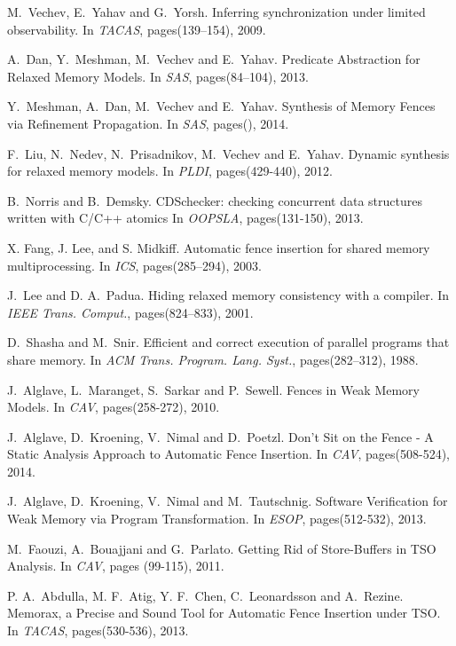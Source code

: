 \documentclass[preprint,9pt]{sigplanconf}
\begin{document}
\begin{thebibliography}{10}
M.~Vechev, E.~Yahav and G.~Yorsh.
\newblock Inferring synchronization under limited observability. 
\newblock In {\em TACAS}, pages(139–154), 2009.

A.~Dan, Y.~Meshman, M.~Vechev and E.~Yahav.
\newblock Predicate Abstraction for Relaxed Memory Models. 
\newblock In {\em SAS}, pages(84–104), 2013.

Y.~Meshman, A.~Dan, M.~Vechev and E.~Yahav.
\newblock Synthesis of Memory Fences via Refinement Propagation.
\newblock In {\em SAS}, pages(), 2014.

F.~Liu, N.~Nedev, N.~Prisadnikov, M.~Vechev and E.~Yahav.
\newblock Dynamic synthesis for relaxed memory models. 
\newblock In {\em PLDI}, pages(429-440), 2012.

B.~Norris and B.~Demsky.
\newblock CDSchecker: checking concurrent data structures written with C/C++ atomics
\newblock In {\em OOPSLA}, pages(131-150), 2013.

X. Fang, J. Lee, and S. Midkiff.
\newblock Automatic fence insertion for shared memory multiprocessing.
\newblock In {\em ICS}, pages(285–294), 2003.

J.~Lee and D. A.~Padua.
\newblock Hiding relaxed memory consistency with a compiler.
\newblock In {\em IEEE Trans. Comput.}, pages(824–833), 2001.

D.~Shasha and M.~Snir.
\newblock Efficient and correct execution of parallel programs that share memory.
\newblock In {\em ACM Trans. Program. Lang. Syst.}, pages(282–312), 1988.

J.~Alglave, L.~Maranget, S.~Sarkar and P.~Sewell. 
\newblock Fences in Weak Memory Models.
\newblock In {\em CAV}, pages(258-272), 2010.

J.~Alglave, D.~Kroening, V.~Nimal and D.~Poetzl. 
\newblock  Don't Sit on the Fence - A Static Analysis Approach to Automatic Fence Insertion.
\newblock In {\em CAV}, pages(508-524), 2014.

J.~Alglave, D.~Kroening, V.~Nimal and M.~Tautschnig. 
\newblock   Software Verification for Weak Memory via Program Transformation.
\newblock In {\em ESOP}, pages(512-532), 2013.

M.~Faouzi, A.~Bouajjani and G.~Parlato.
\newblock Getting Rid of Store-Buffers in TSO Analysis.
\newblock In {\em CAV}, pages (99-115), 2011.

P. A.~Abdulla, M. F.~Atig, Y. F.~Chen, C.~Leonardsson and A.~Rezine.
\newblock Memorax, a Precise and Sound Tool for Automatic Fence Insertion under TSO.
\newblock In {\em TACAS}, pages(530-536), 2013.


\end{thebibliography}
\end{document}
